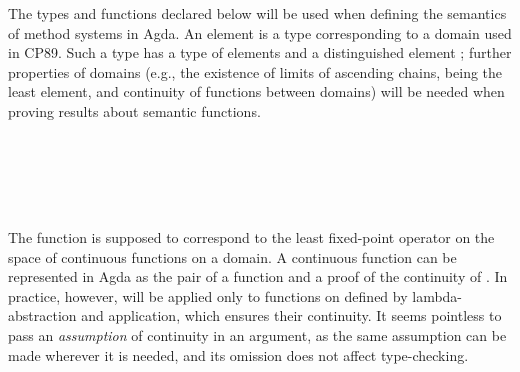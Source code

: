\begin{AgdaAlign}
The types and functions declared below will be used when defining the semantics of method systems in Agda.
An element  is a type corresponding to a domain used in CP89.
Such a type  has a type of elements  and a distinguished element ;
further properties of domains
(e.g., the existence of limits of ascending chains,
 being the least element,
and continuity of functions between domains)
will be needed when proving results about semantic functions.
%
\begin{code}%
\>[0]\AgdaSpace{}%
\<%
\\
\>[0][@{}l@{\AgdaIndent{0}}]%
\>[4]\AgdaSymbol{(}\AgdaSpace{}%
%
\>[14]\AgdaSymbol{:}%
\>[17]\AgdaSpace{}%
\AgdaSymbol{)}%
\>[63]\<%
\\
%
\>[4]\AgdaSymbol{(}\AgdaSpace{}%
%
\>[14]\AgdaSymbol{:}%
\>[17]\AgdaSpace{}%
\AgdaSpace{}%
\AgdaSpace{}%
\AgdaSymbol{)}%
\>[63]\<%
\\
%
\>[4]\AgdaSymbol{(}\AgdaSpace{}%
%
\>[14]\AgdaSymbol{:}%
\>[17]\AgdaSymbol{\{}\AgdaSpace{}%
\AgdaSymbol{:}\AgdaSpace{}%
\AgdaSymbol{\}}\AgdaSpace{}%
\AgdaSpace{}%
\AgdaSpace{}%
\AgdaSpace{}%
\AgdaSpace{}%
\AgdaSymbol{)}%
\>[63]\<%
\\
%
\>[4]\AgdaSymbol{(}\AgdaSpace{}%
%
\>[14]\AgdaSymbol{:}%
\>[17]\AgdaSymbol{\{}\AgdaSpace{}%
\AgdaSymbol{:}\AgdaSpace{}%
\AgdaSymbol{\}}\AgdaSpace{}%
\AgdaSpace{}%
\AgdaSymbol{(}\AgdaSpace{}%
\AgdaSpace{}%
\AgdaSpace{}%
\AgdaSpace{}%
\AgdaSpace{}%
\AgdaSpace{}%
\AgdaSpace{}%
\AgdaSpace{}%
\AgdaSymbol{)}\AgdaSpace{}%
\AgdaSpace{}%
\AgdaSpace{}%
\AgdaSpace{}%
\AgdaSpace{}%
\AgdaSymbol{)}%
\>[63]\<%
\end{code}
%
The function  is supposed to correspond to the least fixed-point operator
on the space of continuous functions on a domain.
A continuous function can be represented in Agda as the pair of a function
 and a proof of the continuity of .
In practice, however,  will be applied only to functions on 
defined by lambda-abstraction and application, which ensures their continuity.
It seems pointless to pass an \emph{assumption} of continuity in an argument,
as the same assumption can be made wherever it is needed, and its omission does not affect type-checking.


\end{AgdaAlign}
